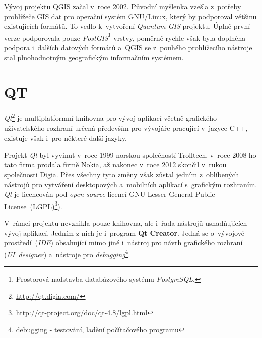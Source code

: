 Vývoj projektu QGIS začal v~roce 2002. Původní myšlenka vzešla z~potřeby 
prohlížeče GIS dat pro operační systém GNU/Linux, který by podporoval většinu 
existujících formátů. To vedlo k~vytvoření \textit{Quantum GIS} projektu. Úplně 
první verze podporovala pouze \textit{PostGIS}\footnote{Prostorová nadstavba 
databázového systému \textit{PostgreSQL}.} vrstvy, poměrně rychle však byla 
doplněna podpora i~dalších datových formátů a~QGIS se z~pouhého prohlížecího 
nástroje stal plnohodnotným geografickým informačním systémem.




\section{QT}
\label{qt}

\textit{Qt}\footnote{\url{http://qt.digia.com/}} je multiplatformní knihovna pro 
vývoj aplikací včetně grafického uživatelského rozhraní určená především 
pro vývojáře pracující v~jazyce C++, existuje však i~pro některé další jazyky.

Projekt \textit{Qt} byl vyvinut v~roce 1999 norskou společností Trolltech, 
v~roce 2008 ho tato firma prodala firmě Nokia, až nakonec v~roce 2012 skončil 
v~rukou společnosti Digia. Přes všechny tyto změny však zůstal jedním z~oblíbených
nástrojů pro vytváření desktopových a~mobilních aplikací s~grafickým rozhraním.
\textit{Qt} je licencován pod \textit{open source} licencí GNU Lesser General 
Public License~(LGPL)\footnote{\url{http://qt-project.org/doc/qt-4.8/lgpl.html}}).

V~rámci projektu nevznikla pouze knihovna, ale i~řada nástrojů usnadňujících
vývoj aplikací. Jedním z nich je i~program \textbf{Qt Creator}. Jedná se o~vývojové 
prostředí~(\textit{IDE}) obsahující mimo jiné i~nástroj pro návrh grafického 
rozhraní (\textit{UI~designer}) a~nástroje pro \textit{debugging}\footnote{debugging
 - testování, ladění počítačového programu}.
